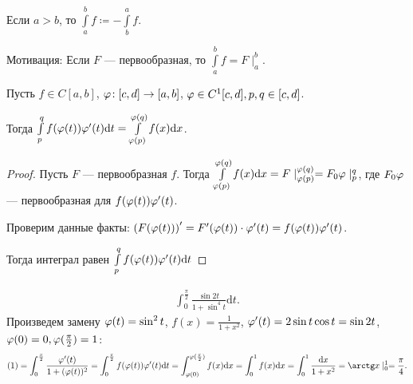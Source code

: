 \begin{remark}[Соглашение]
    Если $a>b$, то  $\int\limits_a^b f \coloneqq -\int\limits_b^a f$.

    Мотивация: Если  $F$ --- первообразная, то  $\int\limits_a^b f = F \mid_a^b$.
\end{remark}
\begin{theorem}
    Пусть $f \in C[a, b]$, $\varphi\!: [c,d] \to [a,b]$, $\varphi \in C^1[c,d], p, q \in [c, d]$.

    Тогда  $\int\limits_p^q f(\varphi(t)) \varphi'(t) \mathrm{d}t = \int\limits_{\varphi(p)}^{\varphi(q)} f(x) \mathrm{d}x$.
\end{theorem}
\begin{proof}
    Пусть $F$ --- первообразная  $f$. Тогда  $\int\limits_{\varphi(p)}^{\varphi(q)}f(x) \mathrm{d}x = F \mid_{\varphi(p)}^{\varphi(q)} = F_0\varphi\mid_p^q$, где $F_0\varphi$ --- первообразная для  $f(\varphi(t))\varphi'(t)$.

    Проверим данные факты:  $\left(F(\varphi(t))\right)' = F'(\varphi(t)) \cdot \varphi'(t) = f(\varphi(t))\varphi'(t)$.

    Тогда интеграл равен $\int\limits_{p}^qf(\varphi(t))\varphi'(t) \mathrm{d}t$
\end{proof}
\begin{example}
\begin{align}
    \int_0^{\frac{\pi}{2}} \frac{\sin 2t}{1 + \sin^4 t} \mathrm{d}t 
.\end{align}
Произведем замену $\varphi(t) = \sin^2 t$,  $f(x) = \frac{1}{1+x^2}$, $\varphi'(t) = 2 \sin t \cos t = \sin 2t$, $\varphi(0) = 0, \varphi(\frac{\pi}{2}) = 1$:
\begin{align*}
    (1) = \int_{0}^{\frac{\pi}{2}} \frac{\vphi'(t)}{1 + (\vphi(t))^2} = \int_{0}^{\frac{\pi}{2}}f(\vphi(t))\vphi'(t) \mathrm{d}t = \int_{\vphi(0)}^{\vphi(\frac{\pi}{2})} f(x)\mathrm{d}x = \int_{0}^{1}f(x)\mathrm{d}x = \int_0^1 \frac{\mathrm{d}x}{1+x^2} = \arctg x \mid_0^1 = \frac{\pi}{4}.
\end{align*}
\end{example}
